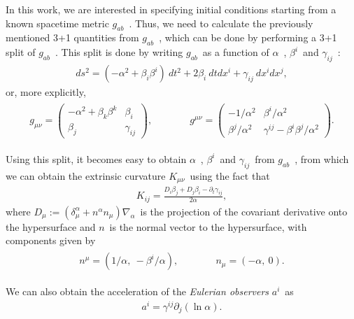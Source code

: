 In this work, we are interested in specifying initial conditions starting from a known spacetime metric $g_{ab}$~. Thus, we need to calculate the previously mentioned 3+1 quantities from $g_{ab}$~, which can be done by performing a 3+1 split of $g_{ab}$~. This split is done by writing $g_{ab}$~as a function of $\alpha$~, $\beta^i$~and $\gamma_{ij}$~:
%
\begin{align}
 ds^2 = (-\alpha^2 + \beta_i \beta^i) ~ dt^2 
     + 2 \beta_i ~ dt dx^i 
     + \gamma_{ij} ~ dx^i dx^j,
\end{align}
%
or, more explicitly,
%
\begin{align}
    \begin{aligned}
        g_{\mu\nu} = \begin{pmatrix} 
            -\alpha^2 + \beta_k \beta^k & \beta_i \\
            \beta_j & \gamma_{ij} 
        \end{pmatrix}, 
        & \quad \quad \quad 
        g^{\mu\nu} = \begin{pmatrix} 
            -1/\alpha^2 & \beta^i/\alpha^2 \\
            \beta^j/\alpha^2 & \gamma^{ij} - \beta^i \beta^j/\alpha^2
        \end{pmatrix}.
    \end{aligned}
\end{align}

Using this split, it becomes easy to obtain $\alpha$~, $\beta^i$~and $\gamma_{ij}$~from $g_{ab}$~, from which we can obtain the extrinsic curvature $K_{\mu\nu}$~using the fact that
%
\begin{align}
 K_{ij} = \frac{D_i \beta_j + D_j \beta_i - \partial_t \gamma_{ij}}{2 \alpha},
\end{align}
%
where $D_\mu := (\delta^\alpha_\mu + n^\alpha n_\mu) \nabla_\alpha$~is the projection of the covariant derivative onto the hypersurface and $n$~is the normal vector to the hypersurface, with components given by
%
\begin{align}
    \begin{aligned}
        n^\mu = (1/\alpha,~-\beta^i/\alpha), 
        & \quad \quad \quad n_\mu = (-\alpha,~0).
    \end{aligned}
\end{align}

We can also obtain the acceleration of the \textit{Eulerian observers} $a^i$~as
\begin{align}
 a^i = \gamma^{ij} \partial_j(\ln \alpha).
\end{align}


